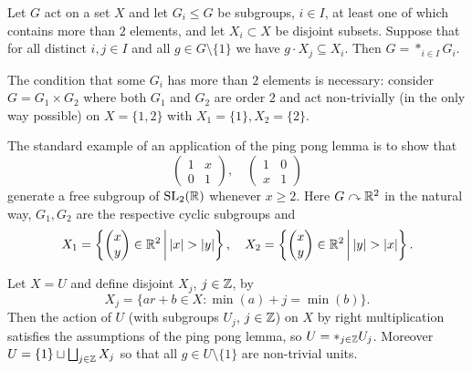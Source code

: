 \begin{lemma}
    Let $G$ act on a set $X$ and let $G_i \leq G$ be subgroups, $i \in I$, at least one of which contains more than $2$ elements, and let $X_i \subset X$ be disjoint subsets.
    Suppose that for all distinct $i, j \in I$ and all $g \in G \setminus \{1\}$ we have $g \cdot X_j \subseteq X_i$.
    Then $G = *_{i \in I} G_i$.
\end{lemma}

\begin{remark}
    The condition that some $G_i$ has more than $2$ elements is necessary: consider $G = G_1 \times G_2$ where both $G_1$ and $G_2$ are order $2$ and act non-trivially (in the only way possible) on $X = \{1, 2\}$ with $X_1 = \{1\}, X_2 = \{2\}$.
\end{remark}

\begin{example}
    The standard example of an application of the ping pong lemma is to show that \[
        \begin{pmatrix}
            1 & x \\
            0 & 1
        \end{pmatrix},
        \quad
        \begin{pmatrix}
            1 & 0 \\
            x & 1
        \end{pmatrix}
    \] generate a free subgroup of $\mathrm{SL}_2(\mathbb{R})$ whenever $x \geq 2$.
    Here $G \curvearrowright \mathbb{R}^2$ in the natural way, $G_1, G_2$ are the respective cyclic subgroups and \[
        X_1 = \left\{ \begin{pmatrix} x \\ y \end{pmatrix} \in \mathbb{R}^2 \,\middle|\, \lvert x \rvert > \lvert y \rvert \right\},
        \quad
        X_2 = \left\{ \begin{pmatrix} x \\ y \end{pmatrix} \in \mathbb{R}^2 \,\middle|\, \lvert y \rvert > \lvert x \rvert \right\}.
    \]
\end{example}

\begin{lemma}
    \label{lemma:mirowicz_pingpong}
    Let $X = U$ and define disjoint $X_j$, $j \in \mathbb{Z}$, by \[
        X_j = \{ ar + b \in X : \min(a) + j = \min(b) \}.
    \]
    Then the action of $U$ (with subgroups $U_j$, $j \in \mathbb{Z}$) on $X$ by right multiplication satisfies the assumptions of the ping pong lemma, so $U = *_{j \in \mathbb{Z}} U_j$.
    Moreover $U = \{1\} \sqcup \bigsqcup_{j \in \mathbb{Z}} X_j$ so that all $g \in U \setminus \{1\}$ are non-trivial units.
\end{lemma}

